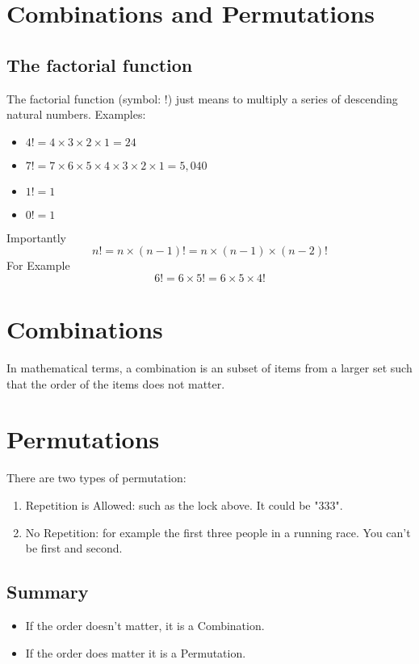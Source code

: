 \documentclass[a4paper,12pt]{article}
\begin{document}

\section*{Combinations and Permutations }
\subsection*{The factorial function}
The factorial function (symbol: !) just means to multiply a series of descending natural numbers. Examples:

\begin{itemize}
\item $4! = 4 \times 3 \times 2 \times 1 = 24$
\item $7! = 7 \times 6 \times 5 \times 4 \times 3 \times 2 \times 1 = 5,040$
\item $1! = 1$
\item $0! = 1 $
\end{itemize}
Importantly 
\[n! = n \times (n-1)!  = n \times (n-1) \times (n-2)! \]
For Example
\[6! = 6 \times 5!  = 6 \times 5 \times 4! \]
\section*{Combinations}
In mathematical terms, a combination is an subset of items from a larger set such that the order of the items does not matter.

\section*{Permutations}
There are two types of permutation:
\begin{enumerate}
\item Repetition is Allowed: such as the lock above. It could be "333".
\item No Repetition: for example the first three people in a running race. You can't be first and second.
\end{enumerate}

\subsection*{Summary}
\begin{itemize}
\item If the order doesn't matter, it is a Combination.
\item If the order does matter it is a Permutation.
\end{itemize}
\end{document}
